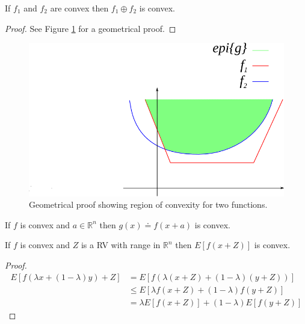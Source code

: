 \begin{theorem}
\label{th:maxconvex}
If $f_1$ and $f_2$ are convex then $f_1\oplus f_2$ is convex.
\end{theorem}

\begin{proof}
See Figure \ref{fig:05convexOplusProof} for a geometrical proof.
\end{proof}

\begin{figure}[ht!]
	\centering
	\includegraphics[width=.4\textwidth]{images/05convexOplusProof}
	\caption{Geometrical proof showing region of convexity for two functions.}
	\label{fig:05convexOplusProof}
\end{figure}

\begin{theorem}
\label{th:argconvex}
If $f$ is convex and $a\in\mathbb{R}^n$ then $g(x)\doteq f(x+a)$ is convex.
\end{theorem}

\begin{theorem}
\label{th:randconvex}
If $f$ is convex and $Z$ is a RV with range in $\mathbb{R}^n$ then $E[f(x+Z)]$ is convex.
\end{theorem}

\begin{proof}
\begin{align*}
E[f(\lambda x+(1-\lambda)y) + Z] &= E[f(\lambda(x+Z) + (1-\lambda)(y+Z))] \\
&\leq E[\lambda f(x+Z) + (1-\lambda)f(y+Z)] \\
&= \lambda E[f(x+Z)] + (1-\lambda)E[f(y+Z)]
\end{align*}
\end{proof}

